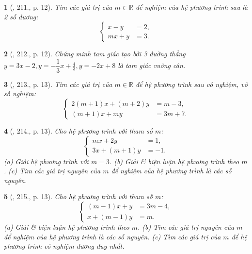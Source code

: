 \documentclass{article}
\newtheorem{baitoan}{}
\begin{document}
\begin{baitoan}[\cite{Binh_Toan_9_tap_2}, 211., p. 12]
	Tìm các giá trị của $m\in\mathbb{R}$ để nghiệm của hệ phương trình sau là 2 số dương:
	\begin{equation*}
		\left\{\begin{split}
			x - y &= 2,\\
			mx + y &= 3.
		\end{split}\right.
	\end{equation*}
\end{baitoan}

\begin{baitoan}[\cite{Binh_Toan_9_tap_2}, 212., p. 12]
	Chứng minh tam giác tạo bởi 3 đường thẳng $y = 3x - 2,y = -\dfrac{1}{3}x + \frac{4}{3},y = -2x + 8$ là tam giác vuông cân.
\end{baitoan}

\begin{baitoan}[\cite{Binh_Toan_9_tap_2}, 213., p. 13]
	Tìm các giá trị của $m\in\mathbb{R}$ để hệ phương trình sau vô nghiệm, vô số nghiệm:
	\begin{equation*}
		\left\{\begin{split}
			2(m + 1)x + (m + 2)y &= m - 3,\\
			(m + 1)x + my &= 3m + 7.
		\end{split}\right.
	\end{equation*}
\end{baitoan}

\begin{baitoan}[\cite{Binh_Toan_9_tap_2}, 214., p. 13]
	Cho hệ phương trình với tham số $m$:
	\begin{equation*}
		\left\{\begin{split}
			mx + 2y &= 1,\\
			3x + (m + 1)y &= -1.
		\end{split}\right.
	\end{equation*}
	(a) Giải hệ phương trình với $m = 3$. (b) Giải \& biện luận hệ phương trình theo $m$. (c) Tìm các giá trị nguyên của $m$ để nghiệm của hệ phương trình là các số nguyên.
\end{baitoan}

\begin{baitoan}[\cite{Binh_Toan_9_tap_2}, 215., p. 13]
	Cho hệ phương trình với tham số $m$:
	\begin{equation*}
		\left\{\begin{split}
			(m - 1)x + y &= 3m - 4,\\
			x + (m - 1)y &= m.
		\end{split}\right.
	\end{equation*}
	(a) Giải \& biện luận hệ phương trình theo $m$. (b) Tìm các giá trị nguyên của $m$ để nghiệm của hệ phương trình là các số nguyên. (c) Tìm các giá trị của $m$ để hệ phương trình có nghiệm dương duy nhất.
\end{baitoan}
\end{document}
